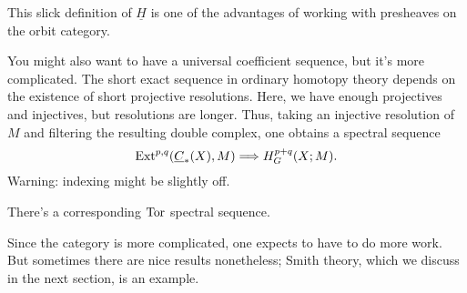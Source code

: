 This slick definition of $\underline H$ is one of the advantages of working with presheaves on the orbit category.
\begin{rem}
You might also want to have a universal coefficient sequence, but it's more complicated. The short exact sequence
in ordinary homotopy theory depends on the existence of short projective resolutions. Here, we have enough
projectives and injectives, but resolutions are longer. Thus, taking an injective resolution of $M$ and filtering
the resulting double complex, one obtains a spectral sequence
\[\operatorname{Ext}^{p,q}(\underline C_*(X), M)\Longrightarrow H_G^{p+q}(X;M).\]
{\color{red}Warning}: indexing might be slightly off.

There's a corresponding $\operatorname{Tor}$ spectral sequence.
\end{rem}
Since the category is more complicated, one expects to have to do more work. But sometimes there are nice results
nonetheless; Smith theory, which we discuss in the next section, is an example.

